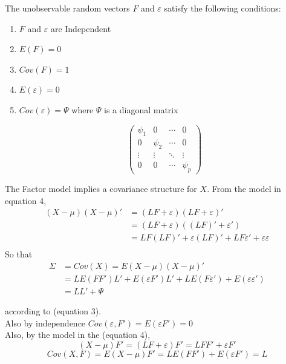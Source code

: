 \documentclass[12pt]{article}
\begin{document}
\noindent The unobservable random vectors $F$ and $\varepsilon$ satisfy the following conditions:
\begin{enumerate}[label= \roman*]
	\item  $F$ and $\varepsilon$ are Independent\\
	\item $E(F)= 0$\\
	\item  $Cov(F)= 1$\\
	\item  $E(\varepsilon)= 0$\\
	\item  $Cov(\varepsilon)= \Psi $ where $\Psi$ is a diagonal matrix
	
	$$\begin{pmatrix}
		\psi_{1} & 0 & \cdots & 0 \\
		0 & \psi_{2} & \cdots & 0 \\
		\vdots & \vdots & \ddots & \vdots \\
		0 & 0 & \cdots & \psi_{p}
	\end{pmatrix}$$
\end{enumerate}
\noindent The Factor model implies a covariance structure for $X$. From the 
model in equation 4, 
\begin{equation}
	\begin{aligned}
		(X-\mu)(X-\mu)' &= (LF+\varepsilon)(LF+\varepsilon)' \\
		&= (LF+\varepsilon)((LF)'+\varepsilon') \\
		&= LF(LF)' + \varepsilon(LF)' + LF\varepsilon' + \varepsilon\varepsilon \\
	\end{aligned}
\end{equation}
So that
\begin{equation}
	\begin{aligned}
		\Sigma & = Cov(X) = E(X-\mu)(X-\mu)' \\
		&=LE(FF')L' + E(\varepsilon F')L' + LE(F\varepsilon')+E(\varepsilon\varepsilon')\\
		&= LL' + \Psi
	\end{aligned}
\end{equation}

\noindent according to (equation 3). \\
Also by independence $Cov(\varepsilon, F')=E(\varepsilon F') = 0$ \\
Also, by the model in the (equation 4),
$$(X - \mu)F'= (LF +\varepsilon)F'=LFF' +\varepsilon F'$$
$$Cov(X,F)= E(X-\mu)F'= LE(FF') + E(\varepsilon F')= L$$
\end{document}
